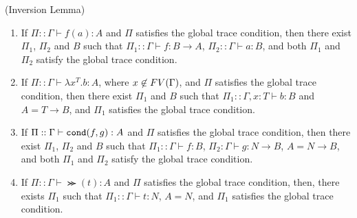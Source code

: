 \begin{lemma}(Inversion Lemma)\label{lem:inversion}
  \begin{enumerate}
  \item\label{lem:inversion1}
    If $\Pi::\Gamma\vdash f(a):A$ and $\Pi$ satisfies the global trace condition, then
    there exist $\Pi_1$, $\Pi_2$ and $B$ such that
    $\Pi_1::\Gamma\vdash f:B\to A$, $\Pi_2::\Gamma\vdash a:B$,
    and both $\Pi_1$ and $\Pi_2$ satisfy the global trace condition. 
  \item\label{lem:inversion2}
    If $\Pi::\Gamma\vdash \lambda x^T.b:A$, where $x\not\in{{\relax FV}}(\Gamma)$,
    and $\Pi$ satisfies the global trace condition, then
    there exist $\Pi_1$ and $B$ such that
    $\Pi_1::\Gamma,x:T\vdash b:B$ and $A = T\to B$,
    and $\Pi_1$ satisfies the global trace condition. 
  \item\label{lem:inversion3}
    If $\Pi::\Gamma\vdash {\tt cond}(f,g):A$ and $\Pi$ satisfies the global trace condition, then
    there exist $\Pi_1$, $\Pi_2$ and $B$ such that
    $\Pi_1::\Gamma \vdash f:B$, $\Pi_2:\Gamma \vdash g:N\to B$, $A = N\to B$,
    and both $\Pi_1$ and $\Pi_2$ satisfy the global trace condition. 
  \item\label{lem:inversion4}
    If $\Pi::\Gamma\vdash \Succ(t):A$ and $\Pi$ satisfies the global trace condition, 
    then, there exists $\Pi_1$ such that $\Pi_1::\Gamma \vdash t:N$, $A=N$, 
 and $\Pi_1$ satisfies the global trace condition. 
  \end{enumerate}
\end{lemma}

%
%
%  
%


